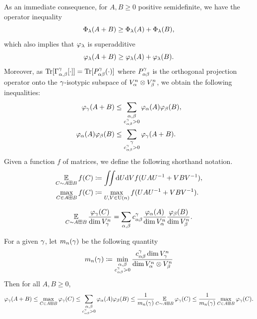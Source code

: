 \documentclass[notitlepage, 10pt]{article}
\begin{document}
    As an immediate consequence, for $A,B \geq 0$ positive semidefinite, we have the operator inequality
    \begin{equation}
        \Phi_{\lambda}(A+B) \geq \Phi_{\lambda}(A) + \Phi_{\lambda}(B),
    \end{equation}
    which also implies that $\varphi_{\lambda}$ is superadditive
    \begin{equation}
        \varphi_{\lambda}(A+B) \geq \varphi_{\lambda}(A) + \varphi_{\lambda}(B).
    \end{equation}
    Moreover, as $\operatorname{Tr}[\Gamma^{\gamma}_{\alpha,\beta}[ \cdot ]] = \operatorname{Tr}[P^{\gamma}_{\alpha\beta} (\cdot)]$ where $P^{\gamma}_{\alpha\beta}$ is the orthogonal projection operator onto the $\gamma$-isotypic subspace of $V_{\alpha}^{n} \otimes V_{\beta}^{n}$, we obtain the following inequalities:
    \begin{align}
        \varphi_{\gamma}(A+B) &\leq \sum_{\substack{\alpha,\beta\\c^{\gamma}_{\alpha\beta} > 0}} \varphi_{\alpha}(A)\varphi_{\beta}(B), \\
        \varphi_{\alpha}(A)\varphi_{\beta}(B) &\leq \sum_{\substack{\gamma\\ c^{\gamma}_{\alpha\beta} > 0}} \varphi_{\gamma}(A+B).
    \end{align}
    Given a function $f$ of matrices, we define the following shorthand notation. 
    \begin{align}
        \operatorname*{\mathbb{E}}_{C\sim A \boxplus B} f(C) &\coloneqq \iint \!\mathrm{d} U \mathrm{d} V f(UAU^{-1}+VBV^{-1}), \\
        \max_{C\in A \boxplus B} f(C) &\coloneqq \max_{U,V \in \operatorname{U}(n)} f(UAU^{-1}+VBV^{-1}).
    \end{align}
    \begin{cor}
        \label{cor:random_sum}
        \begin{equation}
            \operatorname*{\mathbb{E}}_{C \sim A \boxplus B} \frac{\varphi_{\gamma}(C)}{\dim V_{\gamma}^{n}} = \sum_{\alpha,\beta} c^{\gamma}_{\alpha\beta} \frac{\varphi_{\alpha}(A)}{\dim V_{\alpha}^{n}}\frac{\varphi_{\beta}(B)}{\dim V_{\beta}^{n}} .
        \end{equation}
    \end{cor}
    \begin{cor}
        \label{cor:random_sum_ineq}
        For a given $\gamma$, let $m_n(\gamma)$ be the following quantity
        \begin{equation}
            m_n(\gamma) \coloneqq \min_{\substack{\alpha,\beta\\c^{\gamma}_{\alpha\beta} > 0}}\frac{c^{\gamma}_{\alpha\beta} \dim V_{\gamma}^{n}}{\dim V_{\alpha}^{n} \otimes V_{\beta}^{n}}
        \end{equation}
        Then for all $A,B \geq 0$,
        \begin{equation}
            \varphi_{\gamma}(A+B) 
            \leq \max_{C \in A\boxplus B} \varphi_{\gamma}(C) 
            \leq \sum_{\substack{\alpha,\beta\\c^{\gamma}_{\alpha\beta} > 0}} \varphi_{\alpha}(A)\varphi_{\beta}(B) 
            \leq \frac{1}{m_n(\gamma)} \operatorname*{\mathbb{E}}_{C \sim A \boxplus B} \varphi_{\gamma}(C) 
            \leq \frac{1}{m_n(\gamma)} \max_{C \in A\boxplus B} \varphi_{\gamma}(C).
        \end{equation}
    \end{cor}
\end{document}
